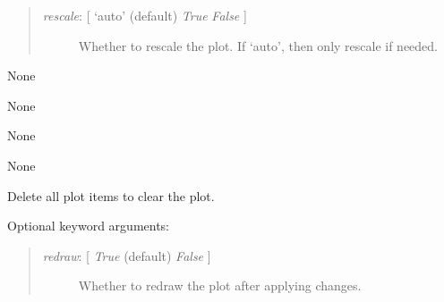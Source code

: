 \documentclass[letterpaper,10pt,english]{sphinxmanual}
\begin{document}
\begin{fulllineitems}
\begin{fulllineitems}
\begin{quote}
\begin{description}
\item[{\emph{rescale}: {[} `auto' (default) \textbar{} \emph{True} \textbar{} \emph{False} {]}}] \leavevmode
Whether to rescale the plot. If `auto', then only rescale if needed.

\end{description}
\end{quote}

\end{fulllineitems}


\begin{fulllineitems}
\label{api:controls.Plot2D.axes_enter_action}
None

\end{fulllineitems}


\begin{fulllineitems}
\label{api:controls.Plot2D.axes_leave_action}
None

\end{fulllineitems}


\begin{fulllineitems}
\label{api:controls.Plot2D.button_press_action}
None

\end{fulllineitems}


\begin{fulllineitems}
\label{api:controls.Plot2D.button_release_action}
None

\end{fulllineitems}


\begin{fulllineitems}
\label{api:controls.Plot2D.clear}
Delete all plot items to clear the plot.

Optional keyword arguments:
\begin{quote}
\begin{description}
\item[{\emph{redraw}: {[} \emph{True}  (default) \textbar{} \emph{False} {]}}] \leavevmode
Whether to redraw the plot after applying changes.


\end{description}
\end{quote}
\end{fulllineitems}
\end{fulllineitems}
\end{document}
